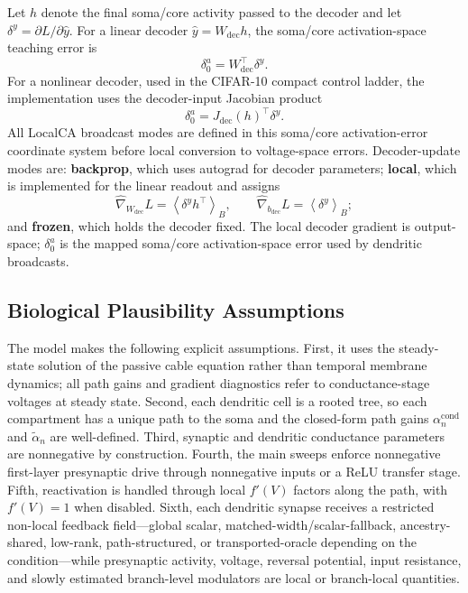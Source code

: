     Let $h$ denote the final soma/core activity passed to the decoder and let $\delta^y=\partial L/\partial \hat{y}$. For a linear decoder $\hat{y}=W_{\mathrm{dec}}h$, the soma/core activation-space teaching error is
    \[
    \delta_0^a=W_{\mathrm{dec}}^\top\delta^y.
    \]
    For a nonlinear decoder, used in the CIFAR-10 compact control ladder, the implementation uses the decoder-input Jacobian product
    \[
    \delta_0^a=J_{\mathrm{dec}}(h)^\top\delta^y.
    \]
    All LocalCA broadcast modes are defined in this soma/core activation-error coordinate system before local conversion to voltage-space errors. Decoder-update modes are: \textbf{backprop}, which uses autograd for decoder parameters; \textbf{local}, which is implemented for the linear readout and assigns
    \[
    \widehat{\nabla}_{W_{\mathrm{dec}}}L=\left\langle \delta^y h^\top\right\rangle_B,
    \qquad
    \widehat{\nabla}_{b_{\mathrm{dec}}}L=\left\langle \delta^y\right\rangle_B;
    \]
    and \textbf{frozen}, which holds the decoder fixed. The local decoder gradient is output-space; $\delta_0^a$ is the mapped soma/core activation-space error used by dendritic broadcasts.
    
    \subsection{Biological Plausibility Assumptions}
    
    The model makes the following explicit assumptions. First, it uses the steady-state solution of the passive cable equation rather than temporal membrane dynamics; all path gains and gradient diagnostics refer to conductance-stage voltages at steady state. Second, each dendritic cell is a rooted tree, so each compartment has a unique path to the soma and the closed-form path gains $\alpha_n^{\mathrm{cond}}$ and $\tilde{\alpha}_n$ are well-defined. Third, synaptic and dendritic conductance parameters are nonnegative by construction. Fourth, the main sweeps enforce nonnegative first-layer presynaptic drive through nonnegative inputs or a ReLU transfer stage. Fifth, reactivation is handled through local $f'(V)$ factors along the path, with $f'(V)=1$ when disabled. Sixth, each dendritic synapse receives a restricted non-local feedback field---global scalar, matched-width/scalar-fallback, ancestry-shared, low-rank, path-structured, or transported-oracle depending on the condition---while presynaptic activity, voltage, reversal potential, input resistance, and slowly estimated branch-level modulators are local or branch-local quantities.
    
